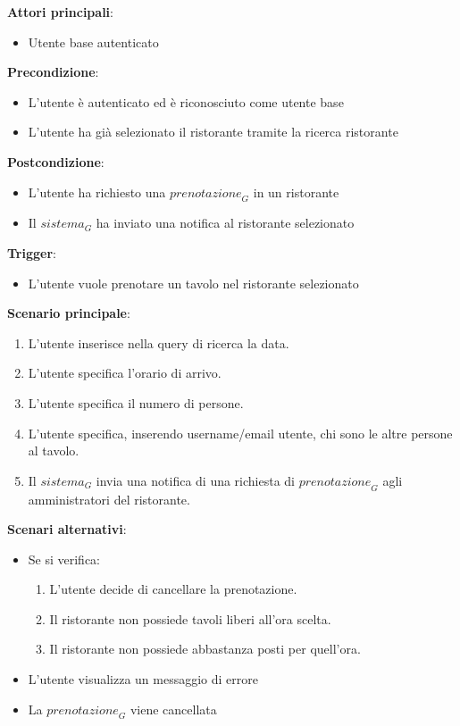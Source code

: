 \textbf{Attori principali}:
\begin{itemize}
    \item Utente base autenticato
\end{itemize}
\textbf{Precondizione}:
\begin{itemize}
    \item L'utente è autenticato ed è riconosciuto come utente base
    \item L'utente ha già selezionato il ristorante tramite la ricerca ristorante 
\end{itemize}
\textbf{Postcondizione}:
\begin{itemize}
    \item L'utente ha richiesto una $\textit{prenotazione}_G$ in un ristorante
    \item Il $\textit{sistema}_G$ ha inviato una notifica al ristorante selezionato
\end{itemize}
\textbf{Trigger}:
\begin{itemize}
    \item L'utente vuole prenotare un tavolo nel ristorante selezionato
\end{itemize}
\textbf{Scenario principale}:
\begin{enumerate}
    \item L'utente inserisce nella query di ricerca la data.
    \item L'utente specifica l'orario di arrivo.
    \item L'utente specifica il numero di persone.
    \item L'utente specifica, inserendo username/email utente, chi sono le altre persone al tavolo.
    \item Il $\textit{sistema}_G$ invia una notifica di una richiesta di $\textit{prenotazione}_G$ agli amministratori del ristorante.
\end{enumerate}
\textbf{Scenari alternativi}:
\begin{itemize}
    \item Se si verifica:
    \begin{enumerate}
        \item L'utente decide di cancellare la prenotazione.
        \item Il ristorante non possiede tavoli liberi all'ora scelta.
        \item Il ristorante non possiede abbastanza posti per quell'ora.
    \end{enumerate}
    \item L'utente visualizza un messaggio di errore
    \item La $\textit{prenotazione}_G$ viene cancellata
\end{itemize}



